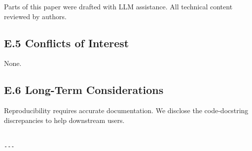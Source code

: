 Parts of this paper were drafted with LLM assistance. All technical content 
reviewed by authors.

\subsection{E.5 Conflicts of Interest}

None.

\subsection{E.6 Long-Term Considerations}

Reproducibility requires accurate documentation. We disclose the 
code-docstring discrepancies to help downstream users.
\begin{lstlisting}

---
\end{lstlisting}